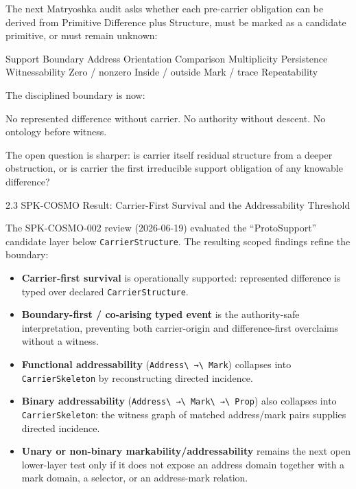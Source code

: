 \documentclass[
  10pt,
]{article}
\newenvironment{Shaded}{}{}
\newcommand{\NormalTok}[1]{#1}
\providecommand{\tightlist}{%
  \setlength{\itemsep}{0pt}\setlength{\parskip}{0pt}}
\providecommand{\tightlist}{%
  \setlength{\itemsep}{0pt}\setlength{\parskip}{0pt}}
\DeclareRobustCommand{\texttt}[1]{{\paperSymbolFont\nolinkurl{#1}}}
\begin{document}
The next Matryoshka audit asks whether each pre-carrier obligation can be derived from Primitive Difference plus Structure, must be marked as a candidate primitive, or must remain unknown:

\begin{Shaded}
\begin{Highlighting}[]
\NormalTok{Support}
\NormalTok{Boundary}
\NormalTok{Address}
\NormalTok{Orientation}
\NormalTok{Comparison}
\NormalTok{Multiplicity}
\NormalTok{Persistence}
\NormalTok{Witnessability}
\NormalTok{Zero / nonzero}
\NormalTok{Inside / outside}
\NormalTok{Mark / trace}
\NormalTok{Repeatability}
\end{Highlighting}
\end{Shaded}

The disciplined boundary is now:

\begin{Shaded}
\begin{Highlighting}[]
\NormalTok{No represented difference without carrier.}
\NormalTok{No authority without descent.}
\NormalTok{No ontology before witness.}
\end{Highlighting}
\end{Shaded}

The open question is sharper: is carrier itself residual structure from a deeper obstruction, or is carrier the first irreducible support obligation of any knowable difference?

2.3 SPK-COSMO Result: Carrier-First Survival and the Addressability Threshold

The SPK-COSMO-002 review (2026-06-19) evaluated the ``ProtoSupport'' candidate layer below \texttt{CarrierStructure}. The resulting scoped findings refine the boundary:

\begin{itemize}
\tightlist
\item
  \textbf{Carrier-first survival} is operationally supported: represented difference is typed over declared \texttt{CarrierStructure}.
\item
  \textbf{Boundary-first / co-arising typed event} is the authority-safe interpretation, preventing both carrier-origin and difference-first overclaims without a witness.
\item
  \textbf{Functional addressability} (\texttt{Address\ →\ Mark}) collapses into \texttt{CarrierSkeleton} by reconstructing directed incidence.
\item
  \textbf{Binary addressability} (\texttt{Address\ →\ Mark\ →\ Prop}) also collapses into \texttt{CarrierSkeleton}: the witness graph of matched address/mark pairs supplies directed incidence.
\item
  \textbf{Unary or non-binary markability/addressability} remains the next open lower-layer test only if it does not expose an address domain together with a mark domain, a selector, or an address-mark relation.
\end{itemize}
\end{document}
